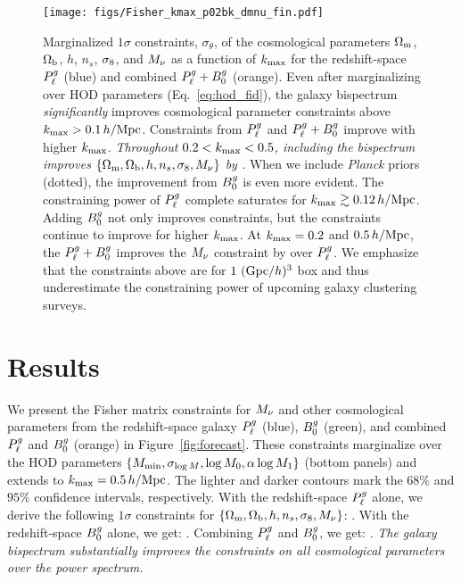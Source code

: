 \begin{figure}
    \begin{center}
        \texttt{[image: figs/Fisher\_kmax\_p02bk\_dmnu\_fin.pdf]}
        \caption{Marginalized $1\sigma$ constraints, $\sigma_\theta$, of the
        cosmological parameters $\Omega_{\rm m}$, $\Omega_{\rm b}$, $h$, $n_s$, $\sigma_8$, and $M_\nu$
        as a function of $k_{\rm max}$ for the redshift-space $P^g_{\ell}$ (blue)
        and combined $P^g_{\ell} + B^g_0$ (orange). Even after marginalizing over
        HOD parameters (Eq.~\ref{eq:hod_fid}), the galaxy bispectrum {\em
        significantly} improves cosmological parameter constraints above
        $k_{\rm max} > 0.1\,h/\mathrm{Mpc}$. Constraints from $P^g_{\ell}$ and
        $P^g_{\ell} + B^g_0$ improve with higher $k_{\rm max}$. {\em Throughout 
        $0.2 < k_{\rm max} < 0.5$, including the bispectrum improves 
        $\{\Omega_{\rm m}, \Omega_{\rm b}, h, n_s, \sigma_8, M_\nu\}$ by .} When we include 
        {\em Planck} priors (dotted), the improvement from $B^g_0$ is even more
        evident. The constraining power of $P^g_{\ell}$ complete
        saturates for $k_{\rm max} \gtrsim 0.12\,h/\mathrm{Mpc}$. Adding $B^g_0$ not only 
        improves constraints, but the constraints continue to improve for
        higher $k_{\rm max}$. At $k_{\rm max} = 0.2$ and $0.5\,h/\mathrm{Mpc}$, the $P^g_{\ell}
        + B^g_0$ improves the $M_\nu$ constraint by  over $P^g_{\ell}$. 
        We emphasize that the constraints above are for $1~({\rm Gpc}/h)^3$ box
        and thus underestimate the constraining power of upcoming galaxy
        clustering surveys.
        }
        \label{fig:kmax_forecast}
    \end{center}
\end{figure}

\section{Results} \label{sec:results} 
We present the Fisher matrix constraints for $M_\nu$ and other cosmological
parameters from the redshift-space galaxy $P^g_{\ell}$ (blue), $B^g_0$ (green), and 
combined $P^g_{\ell}$ and $B^g_0$ (orange) in Figure~\ref{fig:forecast}. These
constraints marginalize over the \cite{zheng2007} HOD parameters $\{M_{\rm min},
\sigma_{\log M}, \log M_0, \alpha \log M_1 \}$ (bottom panels) and extends to
$k_{\rm max} = 0.5\,h/\mathrm{Mpc}$. The lighter and darker contours mark the $68\%$ and
$95\%$ confidence intervals, respectively. With the redshift-space $P^g_{\ell}$
alone, we derive the following $1\sigma$ constraints for $\{\Omega_{\rm m}, \Omega_{\rm b}, h, n_s,
\sigma_8, M_\nu\}$: .
With the redshift-space $B^g_0$ alone, we get: .
Combining $P^g_{\ell}$ and $B^g_0$, we get: . 
{\em The galaxy bispectrum substantially improves the constraints
on all cosmological parameters over the power spectrum.}

